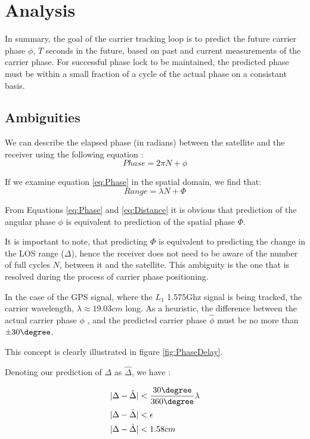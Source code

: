 \chapter{Analysis}\label{ch:Analysis}

In summary, the goal of the carrier tracking loop is to predict the future carrier phase $\phi$, $T$ seconds in the future, based on past and current measurements of the carrier phase. For successful phase lock to be maintained, the predicted phase must be within a small fraction of a cycle of the actual phase on a consistant basis.

\section{Ambiguities}

We can describe the elapsed phase (in radians) between the satellite and the receiver using the following equation :  
\begin{equation}
Phase = 2 \pi N  + \phi 
\label{eq:Phase}
\end{equation}

If we examine equation \ref{eq:Phase} in the spatial domain, we find that: 
\begin{equation}
Range = \lambda N + \Phi
\label{eq:Distance}
\end{equation}

From Equations \ref{eq:Phase} and \ref{eq:Distance} it is obvious that prediction of the angular phase $\phi$ is equivalent to prediction of the spatial phase $\Phi$.

It is important to note, that predicting $\Phi$ is equivalent to predicting the change in the LOS range ($\Delta$), hence the receiver does not need to be aware of the number of full cycles $N$, between it and the satellite. This ambiguity is the one that is resolved during the process of carrier phase positioning. 


In the case of the GPS signal, where the $L_1$ 1.575Ghz signal is being tracked, the carrier wavelength, $\lambda \approx 19.03 cm$ long. As a heuristic, the difference between the actual carrier phase $\phi$ , and the predicted carrier phase $\hat{\phi}$ must be no more than $\pm30 \degree$. 

This concept is clearly illustrated in figure \ref{fig:PhaseDelay}. 

Denoting our prediction of $\Delta$ as $\hat{\Delta}$, we have :

\begin{align}
|\Delta-\hat{\Delta}|& < \frac{30\degree}{360\degree} \lambda\\
|\Delta-\hat{\Delta}|&<\epsilon\\
|\Delta-\hat{\Delta}|&<1.58cm\\
\label{eq:RangeErrorBound}
\end{align}

